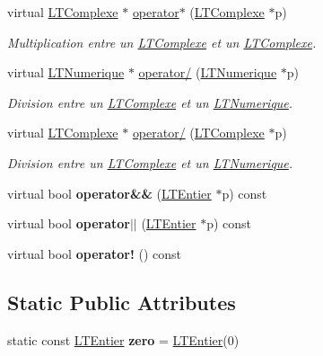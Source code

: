 \begin{DoxyCompactItemize}
virtual \hyperlink{class_l_t_complexe}{L\+T\+Complexe} $\ast$ \hyperlink{class_l_t_entier_a621d0a41b4347cd02f0c99052b9f8e55}{operator$\ast$} (\hyperlink{class_l_t_complexe}{L\+T\+Complexe} $\ast$p)
\begin{DoxyCompactList}\small\item\em Multiplication entre un \hyperlink{class_l_t_complexe}{L\+T\+Complexe} et un \hyperlink{class_l_t_complexe}{L\+T\+Complexe}. \end{DoxyCompactList}\item 
virtual \hyperlink{class_l_t_numerique}{L\+T\+Numerique} $\ast$ \hyperlink{class_l_t_entier_abde7f75a9aec4852f4f624cf94080fdc}{operator/} (\hyperlink{class_l_t_numerique}{L\+T\+Numerique} $\ast$p)
\begin{DoxyCompactList}\small\item\em Division entre un \hyperlink{class_l_t_complexe}{L\+T\+Complexe} et un \hyperlink{class_l_t_numerique}{L\+T\+Numerique}. \end{DoxyCompactList}\item 
virtual \hyperlink{class_l_t_complexe}{L\+T\+Complexe} $\ast$ \hyperlink{class_l_t_entier_a59f046d2849150eba46ffbc1edcf6b95}{operator/} (\hyperlink{class_l_t_complexe}{L\+T\+Complexe} $\ast$p)
\begin{DoxyCompactList}\small\item\em Division entre un \hyperlink{class_l_t_complexe}{L\+T\+Complexe} et un \hyperlink{class_l_t_numerique}{L\+T\+Numerique}. \end{DoxyCompactList}\item 
virtual bool {\bfseries operator\&\&} (\hyperlink{class_l_t_entier}{L\+T\+Entier} $\ast$p) const \hypertarget{class_l_t_entier_a4ce3ced22f60210d8a4fb5186103164f}{}\label{class_l_t_entier_a4ce3ced22f60210d8a4fb5186103164f}

\item 
virtual bool {\bfseries operator$\vert$$\vert$} (\hyperlink{class_l_t_entier}{L\+T\+Entier} $\ast$p) const \hypertarget{class_l_t_entier_a6e7dd1aaac5aa6fa4fd882619fb90712}{}\label{class_l_t_entier_a6e7dd1aaac5aa6fa4fd882619fb90712}

\item 
virtual bool {\bfseries operator!} () const \hypertarget{class_l_t_entier_ad97f456d3ae1c6d755894760c29d85e8}{}\label{class_l_t_entier_ad97f456d3ae1c6d755894760c29d85e8}

\end{DoxyCompactItemize}
\subsection*{Static Public Attributes}
\begin{DoxyCompactItemize}
\item 
static const \hyperlink{class_l_t_entier}{L\+T\+Entier} {\bfseries zero} = \hyperlink{class_l_t_entier}{L\+T\+Entier}(0)\hypertarget{class_l_t_entier_a6b3afa86731df2551f829e4ece67bb8f}{}\label{class_l_t_entier_a6b3afa86731df2551f829e4ece67bb8f}

\end{DoxyCompactItemize}
